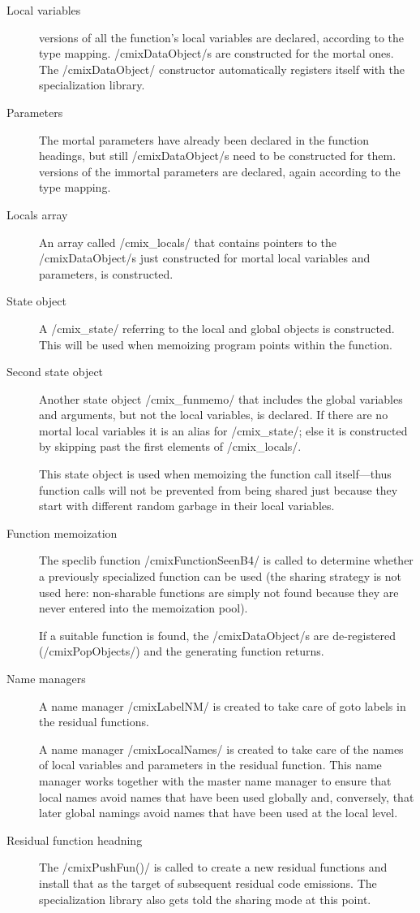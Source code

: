 \begin{docpart}
\begin{description}
\item[Local variables] \Pgen{} versions of all the function's
	local variables are declared, according to the type
	mapping. /cmixDataObject/s are constructed for the
	mortal ones. The /cmixDataObject/ constructor automatically
	registers itself with the specialization library.
\item[Parameters] The mortal parameters have already been declared
	in the function headings, but still /cmixDataObject/s
	need to be constructed for them. \Pgen{} versions of
	the immortal parameters are declared, again according
	to the type mapping.
\item[Locals array] An array called /cmix_locals/ that contains
	pointers to the /cmixDataObject/s just constructed for
	mortal local variables and parameters, is constructed.
\item[State object] A /cmix_state/ referring to the local and
	global objects is constructed. This will be used when
	memoizing program points within the function.
\item[Second state object] Another state object /cmix_funmemo/
	that includes the global variables and arguments, but
	not the local variables, is declared. If there are
	no mortal local variables it is an alias for /cmix_state/;
	else it is constructed by skipping past the first elements
	of /cmix_locals/.

	This state object is used when memoizing
	the function call itself---thus function calls will not
	be prevented from being shared just because they start
	with different random garbage in their local variables.
\item[Function memoization] The speclib function /cmixFunctionSeenB4/
	is called to determine whether a previously specialized
	function can be used (the sharing strategy is not used
	here: non-sharable functions are simply not found because
	they are never entered into the memoization pool).

	If a suitable function is found, the /cmixDataObject/s are
	de-registered (/cmixPopObjects/) and the generating
	function returns.
\item[Name managers] A name manager /cmixLabelNM/ is created
	to take care of goto labels in the residual functions.

	A name manager /cmixLocalNames/ is created to take care
	of the names of local variables and parameters in the
	residual function. This name manager works together
	with the master name manager to ensure that local names
	avoid names that have been used globally and, conversely,
	that later global namings avoid names that have been used
	at the local level.
\item[Residual function headning] The /cmixPushFun()/ is called
	to create a new residual functions and install that as
	the target of subsequent residual code emissions. The
	specialization library also gets told the sharing mode
	at this point.


\end{description}
\end{docpart}
